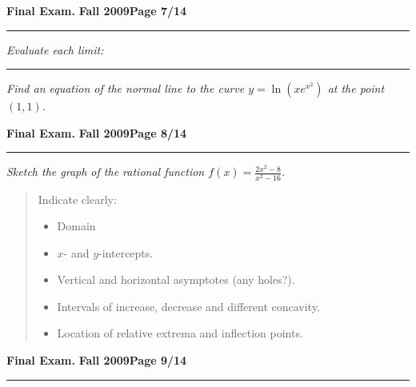 \documentclass[12pt]{article}
\begin{document}
\newpage
\hfill{\large\bf Final Exam.}\hfill{\large\bf
  Fall 2009}\hfill{\large\bf Page 7/14}\hrule

\bigskip
{\problem[10 pts] \em  Evaluate each limit:} 

\bigskip
{}

\vspace{4cm}
\vspace{5cm}

\hrule
{\problem[10 pts] \em Find an equation of the normal line to the
  curve $y=\ln(x e^{x^2})$ at the point $(1,1)$.} 
\newpage

\hfill{\large\bf Final Exam.}\hfill{\large\bf
  Fall 2009}\hfill{\large\bf Page 8/14}\hrule

\bigskip
{\problem[30 pts] \em Sketch the graph of the rational function $f(x)
  = \displaystyle{\frac{2x^2-8}{x^2-16}}$.}
\begin{quotation}
Indicate clearly:
\begin{itemize}
\item Domain
\item $x$- and $y$-intercepts.
\item Vertical and horizontal asymptotes (any holes?).
\item Intervals of increase, decrease and different concavity.
\item Location of relative extrema and inflection points. 
\end{itemize}
\end{quotation}
\newpage

\hfill{\large\bf Final Exam.}\hfill{\large\bf
  Fall 2009}\hfill{\large\bf Page 9/14}\hrule
\end{document}
